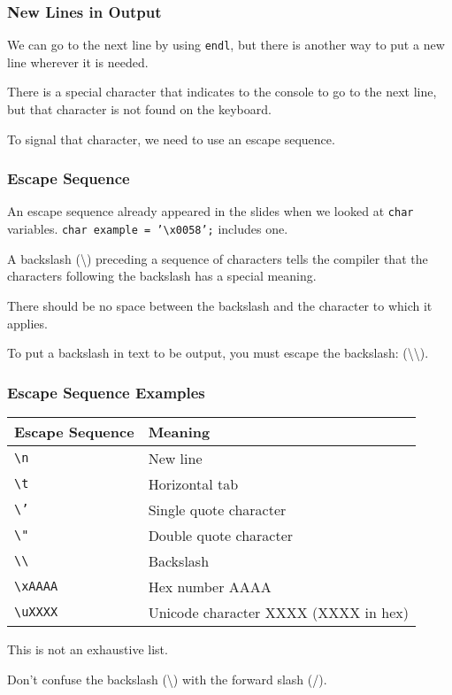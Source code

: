 \begin{frame}
\frametitle{New Lines in Output}
We can go to the next line by using \texttt{endl}, but there is another way to put a new line wherever it is needed.

There is a special character that indicates to the console to go to the next line, but that character is not found on the keyboard.

To signal that character, we need to use an \alert{escape sequence}.

\end{frame}

\begin{frame}
\frametitle{Escape Sequence}
An escape sequence already appeared in the slides when we looked at \texttt{char} variables. \texttt{char example = '\textbackslash x0058';} includes one.

A backslash (\textbackslash) preceding a sequence of characters tells the compiler that the characters following the backslash has a special meaning.

There should be no space between the backslash and the character to which it applies.

To put a backslash in text to be output, you must escape the backslash: (\textbackslash\textbackslash).

\end{frame}

\begin{frame}
\frametitle{Escape Sequence Examples}
\begin{center}
\begin{tabular}{l|l}
	\textbf{Escape Sequence} & \textbf{Meaning} \\ \hline
	\texttt{\textbackslash n} & New line \\ \hline
	\texttt{\textbackslash t} & Horizontal tab \\ \hline
	\texttt{\textbackslash '} & Single quote character \\ \hline
	\texttt{\textbackslash "} & Double quote character \\ \hline
	\texttt{\textbackslash\textbackslash} & Backslash \\ \hline
	\texttt{\textbackslash xAAAA} & Hex number AAAA \\ \hline
	\texttt{\textbackslash uXXXX} & Unicode character XXXX (XXXX in hex)\\
	
\end{tabular}
\end{center}

This is not an exhaustive list.

Don't confuse the backslash (\textbackslash) with the forward slash (/).

\end{frame}

